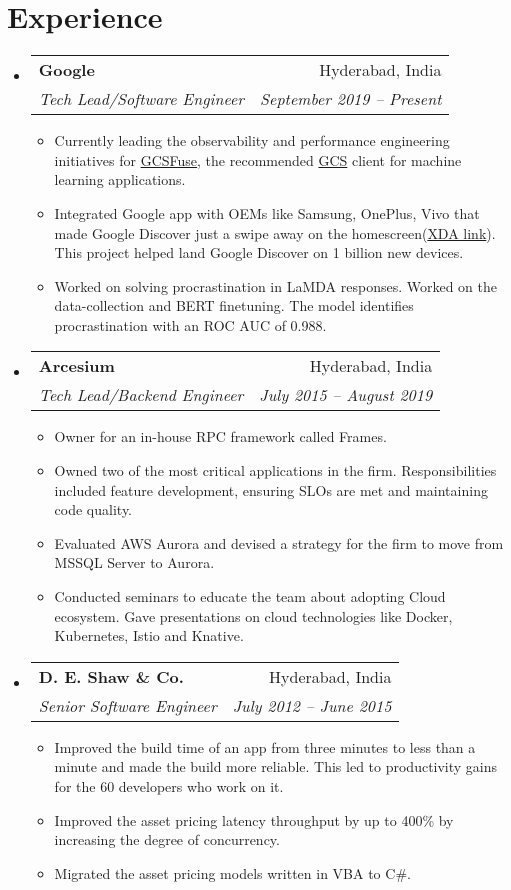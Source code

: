 \documentclass[letterpaper,11pt]{article}
\makeatletter
\newcommand{\resumeSubheading}[4]{
  \vspace{-1pt}\item[]
    \begin{tabular*}{0.97\textwidth}[t]{l@{\extracolsep{\fill}}r}
      \textbf{#1} & #2 \\
      \textit{\small#3} & \textit{\small #4} \\
    \end{tabular*}\vspace{-5pt}
}
\newcommand{\resumeSubItemListStart}{\begin{itemize}\vspace{5pt}}
\newcommand{\resumeSubItemListEnd}{\end{itemize}\vspace{-5pt}}
\newcommand{\resumeSubItem}[1]{\item {#1}}
\newcommand{\resumeSubHeadingListStart}{\begin{itemize}[leftmargin=*]}
\newcommand{\resumeSubHeadingListEnd}{\end{itemize}}
\makeatother
\begin{document}
\section{Experience}
  \resumeSubHeadingListStart
    \resumeSubheading
      {Google}
      {Hyderabad, India}{Tech Lead/Software Engineer}{September 2019 -- Present}
       \resumeSubItemListStart
            \resumeSubItem{
              Currently leading the observability and performance engineering initiatives for \href{https://cloud.google.com/storage/docs/cloud-storage-fuse/overview}{GCSFuse}, the recommended \href{https://cloud.google.com/storage}{GCS} client for machine learning applications.
            }
       		\resumeSubItem{Integrated Google app with OEMs like Samsung, OnePlus, Vivo that made Google Discover just a swipe away on the homescreen(\href{https://www.xda-developers.com/oneplus-launcher-4-5-6-adds-toggle-between-google-discover-oneplus-shelf/}{XDA link}). This project helped land Google Discover on 1 billion new devices.}
       \resumeSubItem{Worked on solving procrastination in LaMDA responses. Worked on the data-collection and BERT finetuning. The model identifies procrastination with an ROC AUC of 0.988.}
              \resumeSubItemListEnd
    \resumeSubheading
      {Arcesium}{Hyderabad, India}
      {Tech Lead/Backend Engineer}{July 2015 -- August 2019}
        \resumeSubItemListStart
          \resumeSubItem{Owner for an in-house RPC framework called Frames.}
          \resumeSubItem{Owned two of the most critical applications in the firm. Responsibilities included feature development, ensuring SLOs are met and maintaining code quality.
          }
          \resumeSubItem{ Evaluated AWS Aurora and devised a strategy for the firm to move from MSSQL Server to Aurora.
          }
      \resumeSubItem{Conducted seminars to educate the team about adopting Cloud ecosystem. Gave presentations on cloud technologies like Docker, Kubernetes, Istio and Knative.}
          \resumeSubItemListEnd

    \resumeSubheading
      {D. E. Shaw \& Co.}{Hyderabad, India}
      {Senior Software Engineer}{July 2012 -- June 2015}
        \resumeSubItemListStart
       \resumeSubItem{Improved the build time of an app from three minutes to less than a minute and made the build more reliable. This led to productivity gains for the 60 developers who work on it.}
         \resumeSubItem{Improved the asset pricing latency throughput by up to 400\% by increasing the degree of concurrency.}
          \resumeSubItem{Migrated the asset pricing models written in VBA to C\#. }
      \resumeSubItemListEnd
  \resumeSubHeadingListEnd
\end{document}
